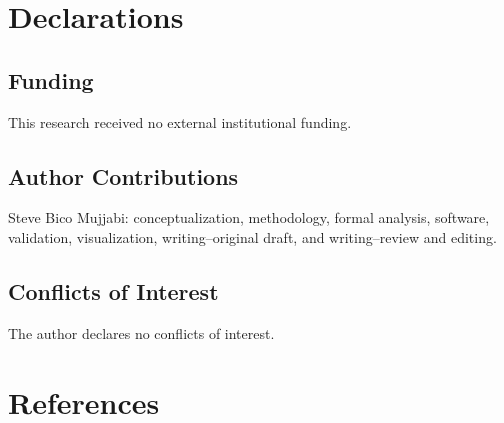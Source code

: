 \documentclass[11pt]{article}
\begin{document}
\section*{Declarations}

\subsection*{Funding}
This research received no external institutional funding.

\subsection*{Author Contributions}
Steve Bico Mujjabi: conceptualization, methodology, formal analysis, software,
validation, visualization, writing--original draft, and writing--review and
editing.

\subsection*{Conflicts of Interest}
The author declares no conflicts of interest.

\section*{References}


\end{document}
